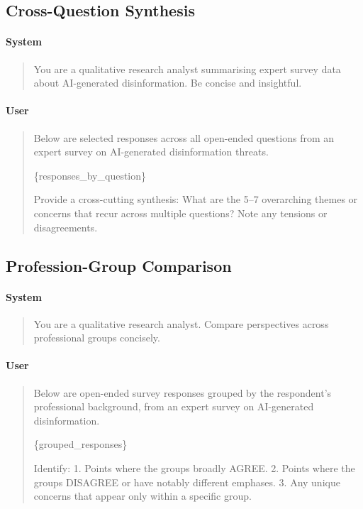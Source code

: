 \subsection{Cross-Question Synthesis}
\label{app:prompt-synthesis}

\paragraph{System}
\begin{quote}\small\ttfamily
You are a qualitative research analyst summarising expert survey data
about AI-generated disinformation. Be concise and insightful.
\end{quote}

\paragraph{User}
\begin{quote}\small\ttfamily
Below are selected responses across all open-ended questions from an
expert survey on AI-generated disinformation threats.

\{responses\_by\_question\}

Provide a cross-cutting synthesis: What are the 5--7 overarching themes
or concerns that recur across multiple questions?
Note any tensions or disagreements.
\end{quote}

\subsection{Profession-Group Comparison}
\label{app:prompt-profession}

\paragraph{System}
\begin{quote}\small\ttfamily
You are a qualitative research analyst.
Compare perspectives across professional groups concisely.
\end{quote}

\paragraph{User}
\begin{quote}\small\ttfamily
Below are open-ended survey responses grouped by the respondent's
professional background, from an expert survey on AI-generated
disinformation.

\{grouped\_responses\}

Identify:
1. Points where the groups broadly AGREE.
2. Points where the groups DISAGREE or have notably different emphases.
3. Any unique concerns that appear only within a specific group.
\end{quote}